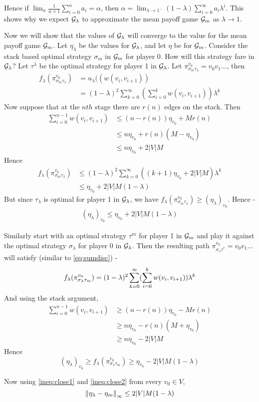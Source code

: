 Hence if $\lim_n \frac{1}{n+1} \sum_{i=0}^n a_i = \alpha$, then $\alpha = \lim_{\lambda \to 1^-} (1-\lambda) \sum_{i=0}^\infty a_i \lambda^i$. This shows why we expect $\mathcal{G}_\lambda$ to approximate the mean payoff game $\mathcal{G}_m$ as $\lambda \to 1$.

Now we will show that the values of $\mathcal{G}_\lambda$ will converge to the value for the mean payoff game $\mathcal{G}_m$. Let $\eta_\lambda$ be the values for $\mathcal{G}_\lambda$, and let $\eta$ be for $\mathcal{G}_m$. Consider the stack based optimal strategy $\sigma_m$ in $\mathcal{G}_m$ for player 0. How will this strategy fare in $\mathcal{G}_\lambda$? Let $\tau^\lambda$ be the optimal strategy for player 1 in $\mathcal{G}_\lambda$. Let $\pi^{v_0}_{\sigma_m\tau_\lambda}=v_0v_1 \ldots$, then 
\begin{align}
    f_\lambda(\pi^{v_0}_{\sigma_m\tau_\lambda}) &= u_\lambda((w(v_i,v_{i+1}))\\
    &= (1-\lambda)^2 \sum_{k=0}^\infty (\sum_{i=0}^k w(v_i,v_{i+1})) \lambda^k \label{eqn:sumdisc}
\end{align}
Now suppose that at the $nth$ stage there are $r(n)$ edges on the stack. Then
\begin{align}
    \sum_{i=0}^{n-1} w(v_i,v_{i+1}) &\leq (n-r(n)) \eta_{v_0} + M r(n)\\
    &\leq n \eta_{v_0} + r(n)(M-\eta_{v_0})\\
    &\leq n \eta_{v_0} + 2|V|M
\end{align}
Hence
\begin{align}
    f_\lambda(\pi^{v_0}_{\sigma_m\tau_\lambda}) &\leq (1-\lambda)^2 \sum_{k=0}^\infty ((k+1)\eta_{v_0} + 2|V|M)\lambda^k\\
    &\leq \eta_{v_0} + 2|V|M (1-\lambda)
\end{align}
But since $\tau_\lambda$ is optimal for player 1 in $\mathcal{G}_\lambda$, we have $f_\lambda(\pi^{v_0}_{\sigma_m\tau_\lambda}) \geq (\eta_\lambda)_{v_0}$. Hence -
\begin{align}
    (\eta_\lambda)_{v_0} \leq \eta_{v_0} + 2|V|M (1-\lambda) \label{ineq:close1}
\end{align}

Similarly start with an optimal strategy $\tau^m$ for player 1 in $\mathcal{G}_m$ and play it against the optimal strategy $\sigma_\lambda$ for player 0 in $\mathcal{G}_\lambda$. Then the resulting path $\pi^{v_0}_{\sigma_\lambda\tau^*}=v_0v_1\ldots$ will satisfy (similar to \eqref{eq:sumdisc}) - 
\[
    f_\lambda(\pi^{v_0}_{\sigma_\lambda\tau_m}) = (1-\lambda)^2 \sum_{k=0}^\infty (\sum_{i=0}^k w(v_i,v_{i+1})) \lambda^k  \\
\]
And using the stack argument, 
\begin{align}
    \sum_{i=0}^{n-1} w(v_i,v_{i+1}) &\geq (n-r(n)) \eta_{v_0} - M r(n)\\
    &\geq n \eta_{v_0} - r(n)(M+\eta_{v_0})\\
    &\geq n \eta_{v_0} - 2|V|M
\end{align}
Hence 
\begin{equation}
    (\eta_\lambda)_{v_0} \geq f_\lambda(\pi^{v_0}_{\sigma_\lambda\tau_m}) \geq \eta_{v_0} - 2|V|M (1-\lambda) \label{ineq:close2}
\end{equation}

Now using \eqref{ineq:close1} and \eqref{ineq:close2} from every $v_0 \in V$,
\begin{equation}
    \left\lVert\eta_\lambda - \eta_m\right\rVert_\infty \leq 2|V|M(1-\lambda)
\end{equation}
